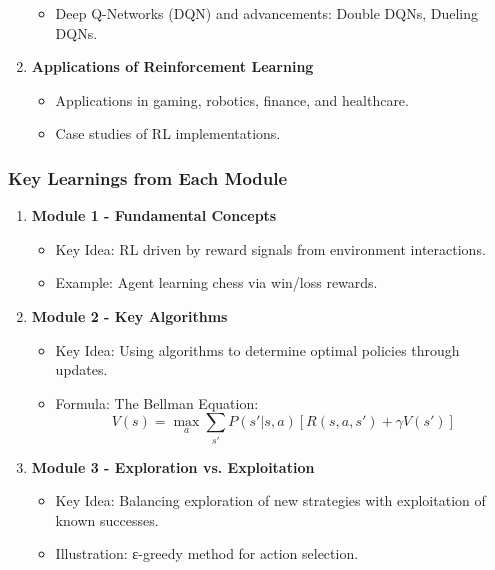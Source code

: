 \documentclass[aspectratio=169]{beamer}
\begin{document}
\begin{frame}[fragile]
\begin{enumerate}
\begin{itemize}
                \item Deep Q-Networks (DQN) and advancements: Double DQNs, Dueling DQNs.
            \end{itemize}
        \item \textbf{Applications of Reinforcement Learning}
            \begin{itemize}
                \item Applications in gaming, robotics, finance, and healthcare.
                \item Case studies of RL implementations.
            \end{itemize}
    \end{enumerate}
\end{frame}

\begin{frame}[fragile]
    \frametitle{Key Learnings from Each Module}
    \begin{enumerate}
        \item \textbf{Module 1 - Fundamental Concepts}
            \begin{itemize}
                \item Key Idea: RL driven by reward signals from environment interactions.
                \item Example: Agent learning chess via win/loss rewards.
            \end{itemize}
        \item \textbf{Module 2 - Key Algorithms}
            \begin{itemize}
                \item Key Idea: Using algorithms to determine optimal policies through updates.
                \item Formula: The Bellman Equation:
                \begin{equation}
                    V(s) = \max_a \sum_{s'} P(s'|s,a) [R(s, a, s') + \gamma V(s')]
                \end{equation}
            \end{itemize}
        \item \textbf{Module 3 - Exploration vs. Exploitation}
            \begin{itemize}
                \item Key Idea: Balancing exploration of new strategies with exploitation of known successes.
                \item Illustration: ε-greedy method for action selection.
            \end{itemize}
    \end{enumerate}
\end{frame}
\end{document}
